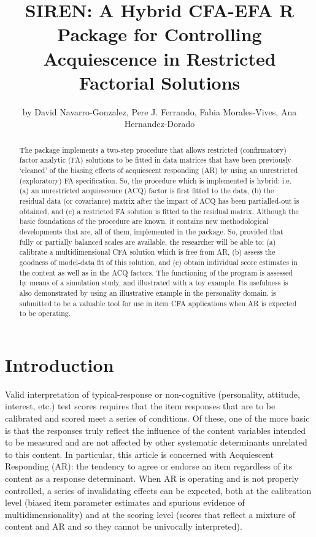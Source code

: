 \title{SIREN: A Hybrid CFA-EFA R Package for Controlling Acquiescence in Restricted Factorial Solutions}
\author{by David Navarro-Gonzalez, Pere J. Ferrando, Fabia Morales-Vives, Ana Hernandez-Dorado}

\maketitle

\begin{abstract}
  The  package implements a two-step procedure that allows restricted (confirmatory) factor analytic (FA) solutions to be fitted in data matrices that have been previously ‘cleaned’ of the biasing effects of acquiescent responding (AR) by using an unrestricted (exploratory) FA specification. So, the procedure which is implemented is hybrid: i.e. (a) an unrestricted acquiescence (ACQ) factor is first fitted to the data, (b) the residual data (or covariance) matrix after the impact of ACQ has been partialled-out is obtained, and (c) a restricted FA solution is fitted to the residual matrix. Although the basic foundations of the procedure are known, it contains new methodological developments that are, all of them, implemented in the package. So, provided that fully or partially balanced scales are available, the researcher will be able to: (a) calibrate a multidimensional CFA solution which is free from AR, (b) assess the goodness of model-data fit of this solution, and (c) obtain individual score estimates in the content as well as in the ACQ factors. The functioning of the program is assessed by means of a simulation study, and illustrated with a toy example. Its usefulness is also demonstrated by using an illustrative example in the personality domain.  is submitted to be a valuable tool for use in item CFA applications when AR is expected to be operating.
\end{abstract}

\section{Introduction}

Valid interpretation of typical-response or non-cognitive (personality, attitude, interest, etc.) test scores requires that the item responses that are to be calibrated and scored meet a series of conditions. Of these, one of the more basic is that the responses truly reflect the influence of the content variables intended to be measured and are not affected by other systematic determinants unrelated to this content. In particular, this article is concerned with Acquiescent Responding (AR): the tendency to agree or endorse an item regardless of its content \citep{Messick:1966} as a response determinant. When AR is operating and is not properly controlled, a series of invalidating effects can be expected, both at the calibration level (biased item parameter estimates and spurious evidence of multidimensionality) and at the scoring level (scores that reflect a mixture of content and AR and so they cannot be univocally interpreted).

